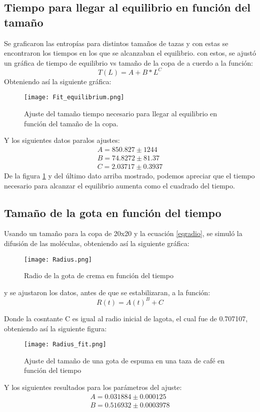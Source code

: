\documentclass{article}
\begin{document}
\subsection{Tiempo para llegar al equilibrio en función del tamaño}
Se graficaron las entropías para distintos tamaños de tazas y con estas se encontraron los tiempos en los que se alcanzaban el equilibrio. con estos, se ajustó un gráfica de tiempo de equilibrio vs tamaño de la copa de a cuerdo a la función:
\begin{equation}
    T(L)=A+B*L^{C}
\end{equation}
Obteniendo así la siguiente gráfica:
\begin{figure}[H]
   \centering
   \texttt{[image: Fit\_equilibrium.png]}
   \caption{Ajuste del tamaño tiempo necesario para llegar al equilibrio en función del tamaño de la copa.}
   \label{fig:eqtime}
 \end{figure}
 
 Y los siguientes datos paralos ajustes:
 \begin{align}
     A=850.827 \pm 1244 \\
     B=74.8272 \pm 81.37 \\
     C=2.03717 \pm 0.3937 
 \end{align}
De la figura \ref{fig:eqtime} y del último dato arriba mostrado, podemos apreciar que el tiempo necesario para alcanzar el equilibrio aumenta como el cuadrado del tiempo.


\subsection{Tamaño de la gota en función del tiempo}
Usando un tamaño para la copa de 20x20 y la ecuación \ref{eqradio}, se simuló la difusión de las moléculas, obteniendo así la siguiente gráfica:
\begin{figure}[H]
   \centering
   \texttt{[image: Radius.png]}
   \caption{Radio de la gota de crema en función del tiempo}
   \label{fig:radius}
 \end{figure}

y se ajustaron los datos, antes de que se estabilizaran, a la función:
\begin{equation}
    R(t)=A(t)^{B}+C
\end{equation}

Donde la cosntante C es igual al radio inicial de lagota, el cual fue de 0.707107, obteniendo así la siguiente figura:
\begin{figure}[H]
   \centering
   \texttt{[image: Radius\_fit.png]}
   \caption{Ajuste del tamaño de una gota de espuma en una taza de café en función del tiempo}
   \label{fig:radius}
 \end{figure}
 Y los siguientes resultados para los parámetros del ajuste:
 \begin{align}
     A=0.031884 \pm 0.000125 \\
     B= 0.516932 \pm 0.0003978
 \end{align}
 
\end{document}
